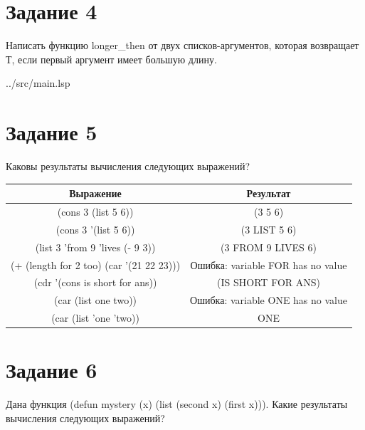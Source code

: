 \section*{Задание 4}
Написать функцию longer\_then от двух списков-аргументов, которая возвращает Т, если первый аргумент имеет большую длину.

\clearpage

\begin{lstinputlisting}[
	caption={Задание 4},
	label={lst:t2},
	linerange={34-40},
	]{../src/main.lsp}
\end{lstinputlisting}

\section*{Задание 5}
Каковы результаты вычисления следующих выражений?

\begin{table}[ht]
	\begin{center}
		\begin{tabular}{|c|c|}
			\hline
			\textbf{Выражение} & \textbf{Результат} \\
			\hline
			(cons 3 (list 5 6)) & (3 5 6)  \\
			\hline
			(cons 3 '(list 5 6)) & (3 LIST 5 6) \\
			\hline
			(list 3 'from 9 'lives (- 9 3)) & (3 FROM 9 LIVES 6) \\
			\hline
			(+ (length for 2 too) (car '(21 22 23))) & Ошибка: variable FOR has no value \\
			\hline
			(cdr '(cons is short for ans)) & (IS SHORT FOR ANS) \\
			\hline
			(car (list one two)) & Ошибка: variable ONE has no value \\
			\hline
			(car (list 'one 'two)) & ONE \\
			\hline
		\end{tabular}
	\end{center}
\end{table}

\section*{Задание 6}
Дана функция (defun mystery (x) (list (second x) (first x))). Какие результаты вычисления следующих выражений?

